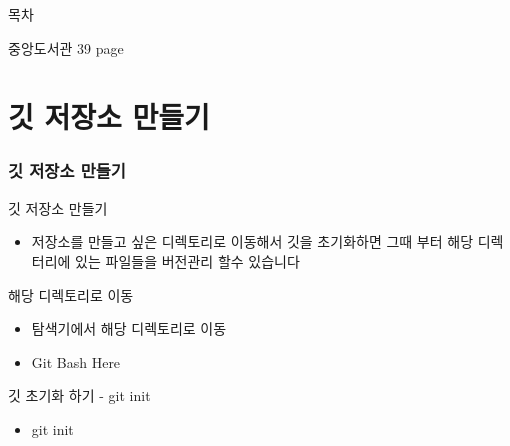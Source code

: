 \documentclass[aspectratio=1610,20pt,xcolor=pdftex,dvipsnames,table,handout]{beamer}
\begin{document}
		\begin{frame} [plain]{목차}
		\tableofcontents%

중앙도서관 39 page 

		\end{frame}
		

			

		\section{깃 저장소 만들기}

		\begin{frame} [t,plain]
		\frametitle{깃 저장소 만들기}

			\begin{block} {깃 저장소 만들기}
			\setlength{\leftmargini}{2em}			
			\begin{itemize}
				\item 저장소를 만들고 싶은 디렉토리로 이동해서 깃을 초기화하면
그때 부터 해당 디렉터리에 있는 파일들을 버전관리 할수 있습니다

			\end{itemize}
			\end{block}						

			\begin{block} {해당 디렉토리로 이동}
			\setlength{\leftmargini}{2em}			
			\begin{itemize}
				\item 탐색기에서 해당 디렉토리로 이동
				\item  Git Bash Here
			\end{itemize}
			\end{block}						


			\begin{block} {깃 초기화 하기 - git init}
			\setlength{\leftmargini}{2em}			
			\begin{itemize}
				\item git init
			\end{itemize}
			\end{block}						

		\end{frame}						


\end{document}
